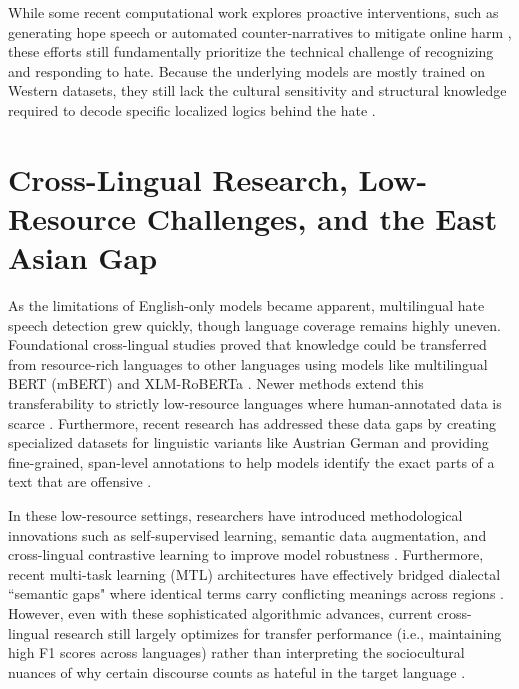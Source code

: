 \documentclass[../CLthesis.tex]{subfiles}
\begin{document}
While some recent computational work explores proactive interventions, such as generating hope speech or automated counter-narratives to mitigate online harm \citep{sharma_stop_2025, jiang_rezg_2025}, these efforts still fundamentally prioritize the technical challenge of recognizing and responding to hate. Because the underlying models are mostly trained on Western datasets, they still lack the cultural sensitivity and structural knowledge required to decode specific localized logics behind the hate \citep{zou2025, cui2025, huang2025, vintar2025}.

\section{Cross-Lingual Research, Low-Resource Challenges, and the East Asian Gap}

As the limitations of English-only models became apparent, multilingual hate speech detection grew quickly, though language coverage remains highly uneven. Foundational cross-lingual studies proved that knowledge could be transferred from resource-rich languages to other languages using models like multilingual BERT (mBERT) and XLM-RoBERTa \citep{corazza_multilingual_2020, aluru_deep_2020}. Newer methods extend this transferability to strictly low-resource languages where human-annotated data is scarce \citep{bigoulaeva_addressing_2022}. Furthermore, recent research has addressed these data gaps by creating specialized datasets for linguistic variants like Austrian German \citep{pachinger_austrotox_2024} and providing fine-grained, span-level annotations to help models identify the exact parts of a text that are offensive \citep{pachinger_disaggregated_nodate}. 

In these low-resource settings, researchers have introduced methodological innovations such as self-supervised learning, semantic data augmentation, and cross-lingual contrastive learning to improve model robustness \citep{hashmi_self-supervised_2025}. Furthermore, recent multi-task learning (MTL) architectures have effectively bridged dialectal ``semantic gaps" where identical terms carry conflicting meanings across regions \citep{ABDELSAMIE2026128584}. However, even with these sophisticated algorithmic advances, current cross-lingual research still largely optimizes for transfer performance (i.e., maintaining high F1 scores across languages) rather than interpreting the sociocultural nuances of why certain discourse counts as hateful in the target language \citep{hashmi_self-supervised_2025, sharma_stop_2025}.
\end{document}

